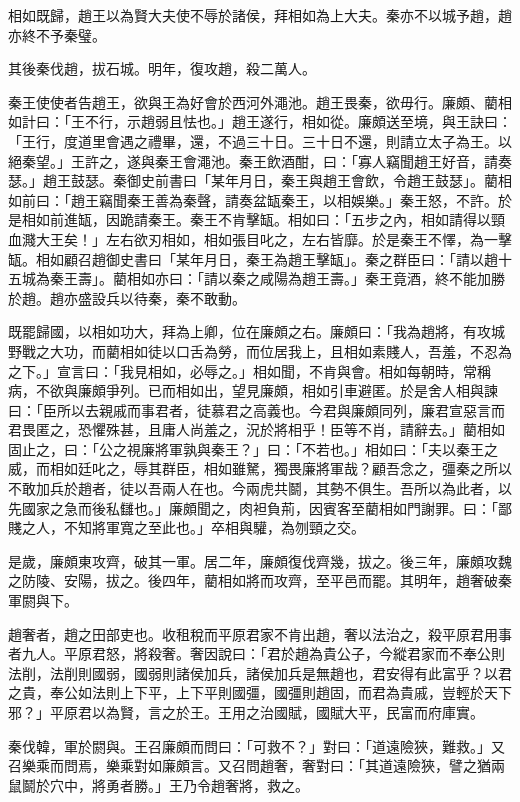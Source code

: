 \begin{pinyinscope}
相如既歸，趙王以為賢大夫使不辱於諸侯，拜相如為上大夫。秦亦不以城予趙，趙亦終不予秦璧。

其後秦伐趙，拔石城。明年，復攻趙，殺二萬人。

秦王使使者告趙王，欲與王為好會於西河外澠池。趙王畏秦，欲毋行。廉頗、藺相如計曰：「王不行，示趙弱且怯也。」趙王遂行，相如從。廉頗送至境，與王訣曰：「王行，度道里會遇之禮畢，還，不過三十日。三十日不還，則請立太子為王。以絕秦望。」王許之，遂與秦王會澠池。秦王飲酒酣，曰：「寡人竊聞趙王好音，請奏瑟。」趙王鼓瑟。秦御史前書曰「某年月日，秦王與趙王會飲，令趙王鼓瑟」。藺相如前曰：「趙王竊聞秦王善為秦聲，請奏盆缻秦王，以相娛樂。」秦王怒，不許。於是相如前進缻，因跪請秦王。秦王不肯擊缻。相如曰：「五步之內，相如請得以頸血濺大王矣！」左右欲刃相如，相如張目叱之，左右皆靡。於是秦王不懌，為一擊缻。相如顧召趙御史書曰「某年月日，秦王為趙王擊缻」。秦之群臣曰：「請以趙十五城為秦王壽」。藺相如亦曰：「請以秦之咸陽為趙王壽。」秦王竟酒，終不能加勝於趙。趙亦盛設兵以待秦，秦不敢動。

既罷歸國，以相如功大，拜為上卿，位在廉頗之右。廉頗曰：「我為趙將，有攻城野戰之大功，而藺相如徒以口舌為勞，而位居我上，且相如素賤人，吾羞，不忍為之下。」宣言曰：「我見相如，必辱之。」相如聞，不肯與會。相如每朝時，常稱病，不欲與廉頗爭列。已而相如出，望見廉頗，相如引車避匿。於是舍人相與諫曰：「臣所以去親戚而事君者，徒慕君之高義也。今君與廉頗同列，廉君宣惡言而君畏匿之，恐懼殊甚，且庸人尚羞之，況於將相乎！臣等不肖，請辭去。」藺相如固止之，曰：「公之視廉將軍孰與秦王？」曰：「不若也。」相如曰：「夫以秦王之威，而相如廷叱之，辱其群臣，相如雖駑，獨畏廉將軍哉？顧吾念之，彊秦之所以不敢加兵於趙者，徒以吾兩人在也。今兩虎共鬬，其勢不俱生。吾所以為此者，以先國家之急而後私讎也。」廉頗聞之，肉袒負荊，因賓客至藺相如門謝罪。曰：「鄙賤之人，不知將軍寬之至此也。」卒相與驩，為刎頸之交。

是歲，廉頗東攻齊，破其一軍。居二年，廉頗復伐齊幾，拔之。後三年，廉頗攻魏之防陵、安陽，拔之。後四年，藺相如將而攻齊，至平邑而罷。其明年，趙奢破秦軍閼與下。

趙奢者，趙之田部吏也。收租稅而平原君家不肯出趙，奢以法治之，殺平原君用事者九人。平原君怒，將殺奢。奢因說曰：「君於趙為貴公子，今縱君家而不奉公則法削，法削則國弱，國弱則諸侯加兵，諸侯加兵是無趙也，君安得有此富乎？以君之貴，奉公如法則上下平，上下平則國彊，國彊則趙固，而君為貴戚，豈輕於天下邪？」平原君以為賢，言之於王。王用之治國賦，國賦大平，民富而府庫實。

秦伐韓，軍於閼與。王召廉頗而問曰：「可救不？」對曰：「道遠險狹，難救。」又召樂乘而問焉，樂乘對如廉頗言。又召問趙奢，奢對曰：「其道遠險狹，譬之猶兩鼠鬬於穴中，將勇者勝。」王乃令趙奢將，救之。


\end{pinyinscope}
